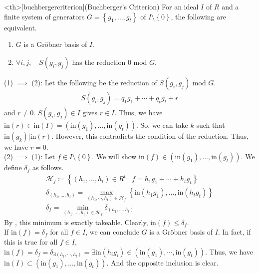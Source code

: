 \documentclass{article}
\renewcommand{\mid}{\middle|}
\begin{document}
\begin{statementsp}<th>[buchbergercriterion](Buchberger's Criterion)
    For an ideal $I$ of $R$ and a finite system of generators $G = \left\{ g_1, \ldots, g_t \right\}$ of $I \setminus \left\{ 0 \right\}$, the following are equivalent.
    \begin{enumerate}
        \item $G$ is a Gr\"{o}bner basis of $I$.
        \item $\forall i,j, \quad S(g_i, g_j)$ has the reduction $0$ mod $G$.
    \end{enumerate}
\end{statementsp}
\begin{pfsp}
    (1) $\implies$ (2): Let the following be the reduction of $S(g_i, g_j)$ mod $G$.
    \begin{align}
        S(g_i, g_j) = q_1 g_1 + \cdots + q_t g_t + r
    \end{align}
    and $r \neq 0$. $S(g_i,g_j) \in I$ gives $r \in I$. Thus, we have $\mathrm{in}(r) \in \mathrm{in}(I) = (\mathrm{in}(g_1), \ldots, \mathrm{in}(g_t))$. So, we can take $k$ such that $\mathrm{in}(g_k) \vert \mathrm{in}(r)$. However, this contradicts the condition of the reduction. Thus, we have $r = 0$.\\
    (2) $\implies$ (1): Let $f \in I \setminus \left\{ 0 \right\}$. We will show $\mathrm{in}(f) \in (\mathrm{in}(g_1), \ldots, \mathrm{in}(g_t))$. We define $\delta_f$ as follows.
    \begin{align}
        \mathcal{H}_f \coloneqq \left\{ (h_1, \ldots, h_t) \in R^t \mid f = h_1 g_1 + \cdots + h_t g_t \right\}\\ 
        \delta_{(h_1, \ldots, h_t)} = \max_{(h_1, \cdots, h_t) \in \mathcal{H}_f} \left\{ \mathrm{in}(h_1 g_1), \ldots, \mathrm{in}(h_t g_t) \right\} \\ 
        \delta_f = \min_{(h_1, \ldots, h_t) \in \mathcal{H}_f} \delta_{(h_1, \ldots, h_t)}
    \end{align}
    By , this minimum is exactly takeable. Clearly, $\mathrm{in}(f) \leq \delta_f$.\\ 
    If $\mathrm{in}(f) = \delta_f$ for all $f \in I$, we can conclude $G$ is a Gr\"{o}bner basis of $I$. In fact, if this is true for all $f \in I$, $\mathrm{in}(f) = \delta_f = \delta_{\exists (h_1, \cdots, h_t)} = \exists \mathrm{in}(h_ig_i) \in (\mathrm{in}(g_1), \cdots, \mathrm{in}(g_t))$. Thus, we have $\mathrm{in}(I) \subset (\mathrm{in}(g_1), \ldots, \mathrm{in}(g_t))$. And the opposite inclusion is clear.\\ 

\end{pfsp}
\end{document}

